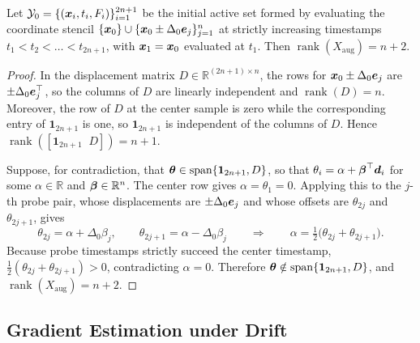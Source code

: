 \begin{corollary}
\label{cor:axis-rank}
Let $\mathcal{Y}_0 = \{(\boldsymbol{x}_i, t_i, F_i)\}_{i=1}^{2n+1}$ be the initial active set formed by evaluating the coordinate stencil $\{\boldsymbol{x}_0\} \cup \{\boldsymbol{x}_0 \pm \Delta_0 \boldsymbol{e}_j\}_{j=1}^n$ at strictly increasing timestamps $t_1 < t_2 < \dots < t_{2n+1}$, with $\boldsymbol{x}_1 = \boldsymbol{x}_0$ evaluated at $t_1$. Then $\operatorname{rank}(X_{\mathrm{aug}}) = n + 2$.
\end{corollary}

\begin{proof}
In the displacement matrix $D \in \mathbb{R}^{(2n+1)\times n}$, the rows for $\boldsymbol{x}_0 \pm \Delta_0 \boldsymbol{e}_j$ are $\pm\Delta_0 \boldsymbol{e}_j^\top$, so the columns of $D$ are linearly independent and $\operatorname{rank}(D) = n$. Moreover, the row of $D$ at the center sample is zero while the corresponding entry of $\mathbf{1}_{2n+1}$ is one, so $\mathbf{1}_{2n+1}$ is independent of the columns of $D$. Hence $\operatorname{rank}([\mathbf{1}_{2n+1} \;\; D]) = n+1$.

Suppose, for contradiction, that $\boldsymbol{\theta} \in \operatorname{span}\{\mathbf{1}_{2n+1}, D\}$, so that $\theta_i = \alpha + \boldsymbol{\beta}^\top \boldsymbol{d}_i$ for some $\alpha \in \mathbb{R}$ and $\boldsymbol{\beta} \in \mathbb{R}^n$. The center row gives $\alpha = \theta_1 = 0$. Applying this to the $j$-th probe pair, whose displacements are $\pm\Delta_0 \boldsymbol{e}_j$ and whose offsets are $\theta_{2j}$ and $\theta_{2j+1}$, gives
\[
  \theta_{2j} = \alpha + \Delta_0 \beta_j,
  \qquad
  \theta_{2j+1} = \alpha - \Delta_0 \beta_j
  \qquad\Longrightarrow\qquad
  \alpha = \tfrac{1}{2}\bigl(\theta_{2j} + \theta_{2j+1}\bigr).
\]
Because probe timestamps strictly succeed the center timestamp, $\tfrac{1}{2}(\theta_{2j}+\theta_{2j+1}) > 0$, contradicting $\alpha = 0$. Therefore $\boldsymbol{\theta} \notin \operatorname{span}\{\mathbf{1}_{2n+1}, D\}$, and $\operatorname{rank}(X_{\mathrm{aug}}) = n+2$.
\end{proof}

\subsection{Gradient Estimation under Drift}
\label{sec:drift-decoupling}

